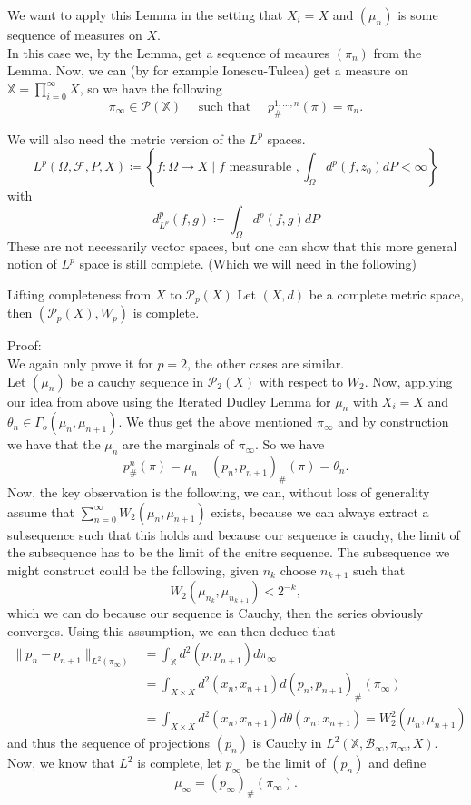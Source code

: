 \documentclass[15pt]{article}
\begin{document}
\bigbreak

We want to apply this Lemma in the setting that $X_i =X$ and $(\mu_n)$ is some sequence of measures on $X$. \\
In this case we, by the Lemma, get a sequence of meaures $(\pi_n)$ from the Lemma. Now, we can (by for example Ionescu-Tulcea) get a measure on $\mathbb{X} = \prod_{i = 0}^\infty X$, so we have the following $$\pi_\infty \in \mathcal{P}(\mathbb{X}) \quad \text{ such that } \quad p^{1,...,n}_{\#}(\pi) = \pi_n.$$

We will also need the metric version of the $L^p$ spaces.
$$L^p(\Omega,\mathcal{F}, P, X) \coloneqq \left\{ f : \Omega \rightarrow X \mid f \text{ measurable }, \int_\Omega d^p(f,z_0) d P < \infty \right\}$$ with$$d_{L^p}^p(f,g) \coloneqq \int_\Omega d^p(f,g) dP$$
These are not necessarily vector spaces, but one can show that this more general notion of $L^p$ space is still complete. (Which we will need in the following)

\begin{theorem}{Lifting completeness from $X$ to $\mathcal{P}_p(X)$}{}
  Let $(X,d)$ be a complete metric space, then $(\mathcal{P}_p(X), W_p)$ is complete.
\end{theorem}

Proof: 
\vspace{0.3cm} \\
We again only prove it for $p = 2$, the other cases are similar.  \\

Let $(\mu_n)$ be a cauchy sequence in $\mathcal{P}_2(X)$ with respect to $W_2$. Now, applying our idea from above using the Iterated Dudley Lemma for $\mu_n$ with $X_i = X$ and $\theta_n \in \Gamma_o(\mu_n,\mu_{n+1})$.
We thus get the above mentioned $\pi_\infty$ and by construction we have that the $\mu_n$ are the marginals of $\pi_\infty$. So we have $$p^n_{\#}(\pi) = \mu_n \quad (p_n,p_{n+1})_{\#}(\pi) = \theta_n.$$ 
Now, the key observation is the following, we can, without loss of generality assume that $\sum\limits_{n = 0}^\infty W_2(\mu_n,\mu_{n+1})$ exists, 
because we can always extract a subsequence such that this holds and because our sequence is cauchy, the limit of the subsequence has to be the limit of the enitre sequence. 
The subsequence we might construct could be the following, given $n_k$ choose $n_{k+1}$ such that $$W_2(\mu_{n_k},\mu_{n_{k+1}}) < 2^{-k},$$ 
which we can do because our sequence is Cauchy, then the series obviously converges.   
Using this assumption, we can then deduce that  
\begin{align*}\|p_n-p_{n+1}\|_{L^2(\pi_{\infty})} &= \int_\mathbb{X} d^2(p,p_{n+1}) d\pi_\infty \\ &= \int_{X \times X} d^2(x_n, x_{n+1}) d(p_n,p_{n+1})_{\#}(\pi_\infty) \\ &= \int_{X \times X} d^2(x_n,x_{n+1}) d\theta(x_n,x_{n+1}) = W_2^2(\mu_n,\mu_{n+1})\end{align*} 
and thus the sequence of projections $(p_n)$ is Cauchy in $L^2(\mathbb{X},\mathcal{B}_\infty,\pi_\infty, X)$. Now, we know that $L^2$ is complete, let $p_\infty$ be the limit of $(p_n)$ and define $$\mu_\infty = (p_\infty)_{\#}(\pi_\infty).$$
\end{document}
